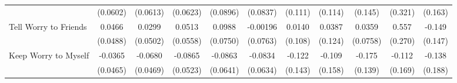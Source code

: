 {\begin{tabular}{l*{10}{c}}
            &    (0.0602)         &    (0.0613)         &    (0.0623)         &    (0.0896)         &    (0.0837)         &     (0.111)         &     (0.114)         &     (0.145)         &     (0.321)         &     (0.163)         \\
\addlinespace
Tell Worry to Friends&      0.0466         &      0.0299         &      0.0513         &      0.0988         &    -0.00196         &      0.0140         &      0.0387         &      0.0359         &       0.557\sym{*}  &      -0.149         \\
            &    (0.0488)         &    (0.0502)         &    (0.0558)         &    (0.0750)         &    (0.0763)         &     (0.108)         &     (0.124)         &    (0.0758)         &     (0.270)         &     (0.147)         \\
\addlinespace
Keep Worry to Myself&     -0.0365         &     -0.0680         &     -0.0865         &     -0.0863         &     -0.0834         &      -0.122         &      -0.109         &      -0.175         &      -0.112         &      -0.138         \\
            &    (0.0465)         &    (0.0469)         &    (0.0523)         &    (0.0641)         &    (0.0634)         &     (0.143)         &     (0.158)         &     (0.139)         &     (0.169)         &     (0.188)         \\
\bottomrule
\end{tabular}
}
